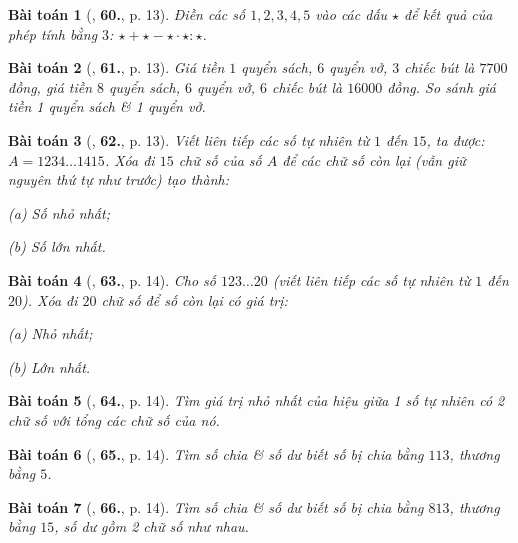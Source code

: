 \documentclass{article}
\numberwithin{equation}{section}
\newtheorem{baitoan}{Bài toán}
\begin{document}
\begin{baitoan}[\cite{Binh_Toan_6_tap_1}, \textbf{60.}, p. 13]
	Điền các số $1,2,3,4,5$ vào các dấu $\star$ để kết quả của phép tính bằng $3$: $\star+\star-\star\cdot\star:\star$.
\end{baitoan}

\begin{baitoan}[\cite{Binh_Toan_6_tap_1}, \textbf{61.}, p. 13]
	Giá tiền $1$ quyển sách, $6$ quyển vở, $3$ chiếc bút là $7700$ đồng, giá tiền $8$ quyển sách, $6$ quyển vở, $6$ chiếc bút là $16000$ đồng. So sánh giá tiền 1 quyển sách \& 1 quyển vở.
\end{baitoan}

\begin{baitoan}[\cite{Binh_Toan_6_tap_1}, \textbf{62.}, p. 13]
	Viết liên tiếp các số tự nhiên từ $1$ đến $15$, ta được: $A = 1234\ldots1415$. Xóa đi $15$ chữ số của số $A$ để các chữ số còn lại (vẫn giữ nguyên thứ tự như trước) tạo thành:
	\begin{enumerate*}
		\item[(a)] Số nhỏ nhất;
		\item[(b)] Số lớn nhất.
	\end{enumerate*}
\end{baitoan}

\begin{baitoan}[\cite{Binh_Toan_6_tap_1}, \textbf{63.}, p. 14]
	Cho số $123\ldots20$ (viết liên tiếp các số tự nhiên từ $1$ đến $20$). Xóa đi $20$ chữ số để số còn lại có giá trị:
	\begin{enumerate*}
		\item[(a)] Nhỏ nhất;
		\item[(b)] Lớn nhất.
	\end{enumerate*}
\end{baitoan}

\begin{baitoan}[\cite{Binh_Toan_6_tap_1}, \textbf{64.}, p. 14]
	Tìm giá trị nhỏ nhất của hiệu giữa 1 số tự nhiên có 2 chữ số với tổng các chữ số của nó.
\end{baitoan}

\begin{baitoan}[\cite{Binh_Toan_6_tap_1}, \textbf{65.}, p. 14]
	Tìm số chia \& số dư biết số bị chia bằng $113$, thương bằng $5$.
\end{baitoan}

\begin{baitoan}[\cite{Binh_Toan_6_tap_1}, \textbf{66.}, p. 14]
	Tìm số chia \& số dư biết số bị chia bằng $813$, thương bằng $15$, số dư gồm 2 chữ số như nhau.
\end{baitoan}
\end{document}
